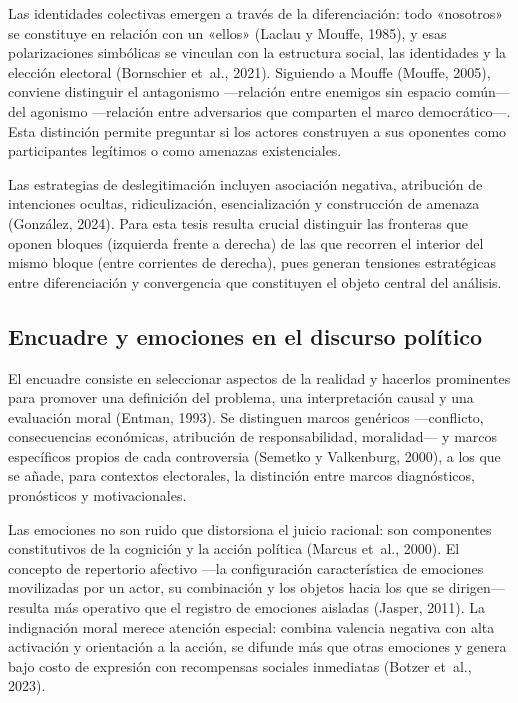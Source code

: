 \documentclass[
  letterpaper,
  numbers=noendperiod,
  fontsize=11pt,
  DIV=12,
  titlepage=false]{scrreprt}
\begin{document}
Las identidades colectivas emergen a través de la diferenciación: todo
«nosotros» se constituye en relación con un «ellos» (Laclau y Mouffe,
1985), y esas polarizaciones simbólicas se vinculan con la estructura
social, las identidades y la elección electoral (Bornschier et~al.,
2021). Siguiendo a Mouffe (Mouffe, 2005), conviene distinguir el
antagonismo ---relación entre enemigos sin espacio común--- del agonismo
---relación entre adversarios que comparten el marco democrático---.
Esta distinción permite preguntar si los actores construyen a sus
oponentes como participantes legítimos o como amenazas existenciales.

Las estrategias de deslegitimación incluyen asociación negativa,
atribución de intenciones ocultas, ridiculización, esencialización y
construcción de amenaza (González, 2024). Para esta tesis resulta
crucial distinguir las fronteras que oponen bloques (izquierda frente a
derecha) de las que recorren el interior del mismo bloque (entre
corrientes de derecha), pues generan tensiones estratégicas entre
diferenciación y convergencia que constituyen el objeto central del
análisis.

\subsection{Encuadre y emociones en el discurso
político}\label{encuadre-y-emociones-en-el-discurso-poluxedtico}

El encuadre consiste en seleccionar aspectos de la realidad y hacerlos
prominentes para promover una definición del problema, una
interpretación causal y una evaluación moral (Entman, 1993). Se
distinguen marcos genéricos ---conflicto, consecuencias económicas,
atribución de responsabilidad, moralidad--- y marcos específicos propios
de cada controversia (Semetko y Valkenburg, 2000), a los que se añade,
para contextos electorales, la distinción entre marcos diagnósticos,
pronósticos y motivacionales.

Las emociones no son ruido que distorsiona el juicio racional: son
componentes constitutivos de la cognición y la acción política (Marcus
et~al., 2000). El concepto de repertorio afectivo ---la configuración
característica de emociones movilizadas por un actor, su combinación y
los objetos hacia los que se dirigen--- resulta más operativo que el
registro de emociones aisladas (Jasper, 2011). La indignación moral
merece atención especial: combina valencia negativa con alta activación
y orientación a la acción, se difunde más que otras emociones y genera
bajo costo de expresión con recompensas sociales inmediatas (Botzer
et~al., 2023).
\end{document}
